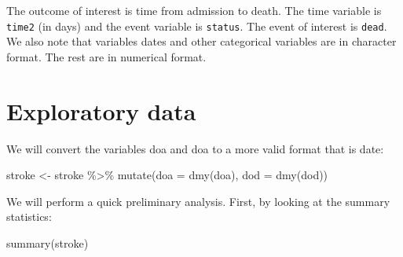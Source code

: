 \documentclass[
  10pt,
]{krantz}
\newenvironment{Shaded}{\begin{snugshade}}{\end{snugshade}}
\newcommand{\AttributeTok}[1]{\textcolor[rgb]{0.77,0.63,0.00}{#1}}
\newcommand{\FunctionTok}[1]{\textcolor[rgb]{0.00,0.00,0.00}{#1}}
\newcommand{\NormalTok}[1]{#1}
\newcommand{\OtherTok}[1]{\textcolor[rgb]{0.56,0.35,0.01}{#1}}
\newcommand{\SpecialCharTok}[1]{\textcolor[rgb]{0.00,0.00,0.00}{#1}}
\begin{document}
The outcome of interest is time from admission to death. The time variable is \texttt{time2} (in days) and the event variable is \texttt{status}. The event of interest is \texttt{dead}. We also note that variables dates and other categorical variables are in character format. The rest are in numerical format.

\hypertarget{exploratory-data}{%
\section{Exploratory data}\label{exploratory-data}}

We will convert the variables doa and doa to a more valid format that is date:

\begin{Shaded}
\begin{Highlighting}[]
\NormalTok{stroke }\OtherTok{\textless{}{-}} 
\NormalTok{  stroke }\SpecialCharTok{\%\textgreater{}\%}
  \FunctionTok{mutate}\NormalTok{(}\AttributeTok{doa =} \FunctionTok{dmy}\NormalTok{(doa),}
         \AttributeTok{dod =} \FunctionTok{dmy}\NormalTok{(dod))}
\end{Highlighting}
\end{Shaded}

We will perform a quick preliminary analysis. First, by looking at the summary statistics:

\begin{Shaded}
\begin{Highlighting}[]
\FunctionTok{summary}\NormalTok{(stroke)}
\end{Highlighting}
\end{Shaded}
\end{document}
